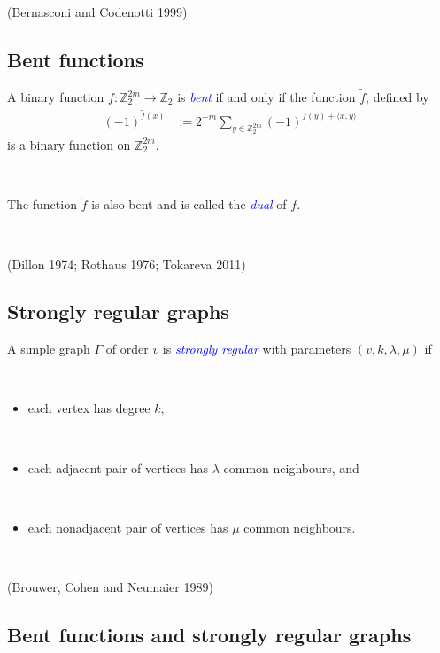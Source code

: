 \documentclass[12pt,a4paper]{article}
\newcommand{\mb}[1]{\mathbb{#1}}
\newcommand{\Z}{\mb{Z}}
\newcommand{\To}{\rightarrow}
\newcommand{\slidecite}[1]{\tiny{(#1)}\normalsize{}}
\newcommand{\Emph}[1]{\emph{\textcolor{blue}{#1}}}
\newcommand{\dual}[1]{\widetilde{#1}}
\begin{document}
\slidecite{Bernasconi and Codenotti 1999} %
\subsection*{Bent functions}

A binary function  $f : \Z_2^{2m} \To \Z_2$ is \Emph{bent} if and only if the function $\dual{f}$, defined by
\begin{align*}
(-1)^{\dual{f}(x)} &:= 2^{-m} \sum_{y \in \Z_2^{2m}} (-1)^{f(y) + \langle x, y \rangle}
\end{align*}
is a binary function on $\Z_2^{2m}$.

~

The function $\dual{f}$ is also bent and is called the \Emph{dual} of $f$.

~

\slidecite{Dillon 1974; Rothaus 1976; Tokareva 2011}

\subsection*{Strongly regular graphs}
A simple graph $\Gamma$ of order $v$ is \Emph{strongly regular} with parameters 
$(v,k,\lambda,\mu)$ if 

~

\begin{itemize}
 \item 
each vertex has degree $k,$ 

~
 \item 
each adjacent pair of vertices has $\lambda$ common neighbours, and

~
\item
each nonadjacent pair of vertices has $\mu$ common neighbours.
\end{itemize}

~

\slidecite{Brouwer, Cohen and Neumaier 1989} %


\subsection*{Bent functions and strongly regular graphs}
\end{document}
